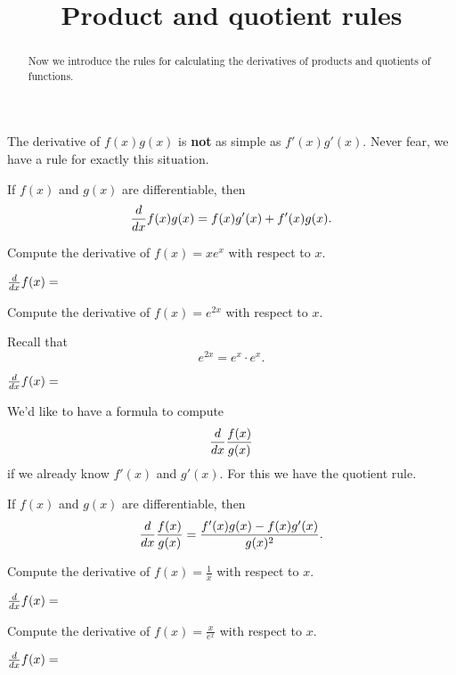 \documentclass{ximera}
\title{Product and quotient rules}
\begin{document}
\begin{abstract}
  Now we introduce the rules for calculating the derivatives of
  products and quotients of functions.
\end{abstract}
\maketitle

The derivative of $f(x)g(x)$ is \textbf{not} as simple as
$f'(x)g'(x)$. Never fear, we have a rule for exactly this situation.

\begin{theorem}
If $f(x)$ and $g(x)$ are differentiable, then
\[
\frac{d}{dx} f(x)g(x) = f(x)g'(x)+f'(x)g(x).
\]
\end{theorem}


\begin{question}
  Compute the derivative of $f(x) = xe^x$ with respect to $x$.  
\begin{prompt}
$\frac{d}{dx} f(x) = $
\end{prompt}  
\end{question}

\begin{question}
  Compute the derivative of $f(x) = e^{2x}$ with respect to $x$.  
\begin{hint} 
Recall that 
\[
e^{2x} = e^x \cdot e^x.
\]
\end{hint}
\begin{prompt}
$\frac{d}{dx} f(x) = $
\end{prompt}  
\end{question}

We'd like to have a formula to compute
\[
\frac{d}{dx} \frac{f(x)}{g(x)}
\]
if we already know $f'(x)$ and $g'(x)$. For this we have the quotient
rule.

\begin{theorem}
If $f(x)$ and $g(x)$ are differentiable, then
\[
\frac{d}{dx} \frac{f(x)}{g(x)} = \frac{f'(x)g(x)-f(x)g'(x)}{g(x)^2}.
\]
\end{theorem}

\begin{question}
  Compute the derivative of $f(x) = \frac{1}{x}$ with respect to $x$.  
\begin{prompt}
$\frac{d}{dx} f(x) = $
\end{prompt}  
\end{question}


\begin{question}
  Compute the derivative of $f(x) = \frac{x}{e^x}$ with respect to $x$.  
\begin{prompt}
$\frac{d}{dx} f(x) = $
\end{prompt}  
\end{question}
\end{document}
